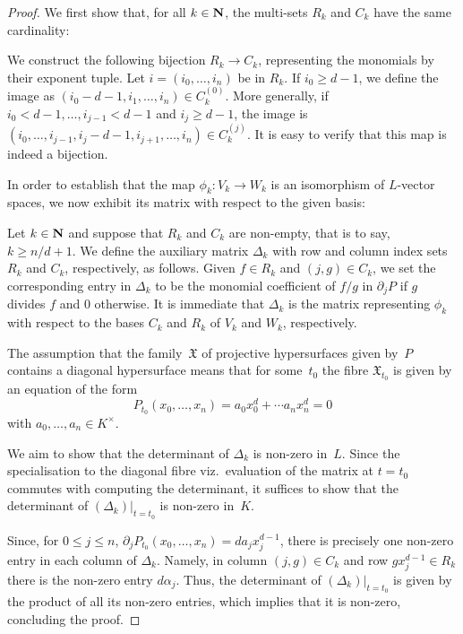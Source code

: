 \begin{proof}
We first show that, for all $k \in \mathbf{N}$, the multi-sets $R_k$ and $C_k$ 
have the same cardinality:

We construct the following bijection $R_k \to C_k$, representing the 
monomials by their exponent tuple.  Let $i = (i_0, \dotsc, i_n)$ be in 
$R_k$.  If $i_0 \geq d-1$, we define the image as
 $(i_0-d-1, i_1, \dotsc, i_n) \in C_k^{(0)}$.  More generally, if 
$i_0 < d-1, \dotsc, i_{j-1} < d-1$ and $i_j \geq d-1$, the image is 
$(i_0, \dotsc, i_{j-1}, i_j-d-1, i_{j+1}, \dotsc, i_n) \in C_k^{(j)}$.  
It is easy to verify that this map is indeed a bijection.

In order to establish that the map $\phi_k \colon V_k \to W_k$ is an 
isomorphism of $L$-vector spaces, we now exhibit its matrix with respect to 
the given basis:

Let $k \in \mathbf{N}$ and suppose that $R_k$ and $C_k$ are non-empty, that is 
to say, $k \geq n/d + 1$.  We define the auxiliary matrix $\Delta_k$ with 
row and column index sets $R_k$ and $C_k$, respectively, as follows.  
Given $f \in R_k$ and $(j,g) \in C_k$, we set the corresponding entry in 
$\Delta_k$ to be the monomial coefficient of $f/g$ in $\partial_j P$ if 
$g$ divides $f$ and $0$ otherwise.  It is immediate that $\Delta_k$ is the 
matrix representing $\phi_k$ with respect to the bases $C_k$ and $R_k$ of 
$V_k$ and $W_k$, respectively.

The assumption that the family~$\mathfrak{X}$ of projective hypersurfaces 
given by~$P$ contains a diagonal hypersurface means that for some~$t_0$ 
the fibre $\mathfrak{X}_{t_0}$ is given by an equation of the form 
\begin{equation*}
P_{t_0}(x_0, \dotsc, x_n) = a_0 x_0^d + \dotsb a_n x_n^d = 0
\end{equation*}
with $a_0, \dotsc, a_n \in K^{\times}$.

We aim to show that the determinant of $\Delta_k$ is non-zero in~$L$.  Since 
the specialisation to the diagonal fibre viz.\ evaluation of the matrix at 
$t = t_0$ commutes with computing the determinant, it suffices to show that 
the determinant of $(\Delta_k) \big |_{t=t_0}$ is non-zero in~$K$.

Since, for $0 \leq j \leq n$, 
$\partial_j P_{t_0} (x_0, \dotsc, x_n) = d a_j x_j^{d-1}$, there is 
precisely one non-zero entry in each column of $\Delta_k$.  Namely, in column 
$(j, g) \in C_k$ and row $g x_j^{d-1} \in R_k$ there is the non-zero entry 
$d \alpha_j$.  Thus, the determinant of $(\Delta_k) \big |_{t=t_0}$ is given 
by the product of all its non-zero entries, which implies that it is non-zero, 
concluding the proof.
\end{proof}

